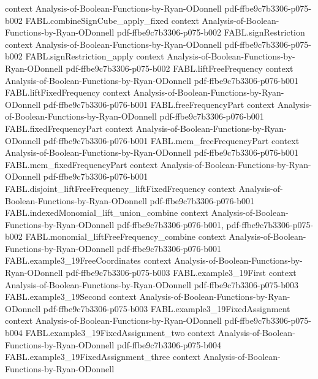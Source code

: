 \begin{theorem}
  {context}
  {Analysis-of-Boolean-Functions-by-Ryan-ODonnell}
  {pdf-ffbe9c7b3306-p075-b002}
\proofstep
  {FABL.combineSignCube_apply_fixed}
  {context}
  {Analysis-of-Boolean-Functions-by-Ryan-ODonnell}
  {pdf-ffbe9c7b3306-p075-b002}
\proofstep
  {FABL.signRestriction}
  {context}
  {Analysis-of-Boolean-Functions-by-Ryan-ODonnell}
  {pdf-ffbe9c7b3306-p075-b002}
\proofstep
  {FABL.signRestriction_apply}
  {context}
  {Analysis-of-Boolean-Functions-by-Ryan-ODonnell}
  {pdf-ffbe9c7b3306-p075-b002}
\proofstep
  {FABL.liftFreeFrequency}
  {context}
  {Analysis-of-Boolean-Functions-by-Ryan-ODonnell}
  {pdf-ffbe9c7b3306-p076-b001}
\proofstep
  {FABL.liftFixedFrequency}
  {context}
  {Analysis-of-Boolean-Functions-by-Ryan-ODonnell}
  {pdf-ffbe9c7b3306-p076-b001}
\proofstep
  {FABL.freeFrequencyPart}
  {context}
  {Analysis-of-Boolean-Functions-by-Ryan-ODonnell}
  {pdf-ffbe9c7b3306-p076-b001}
\proofstep
  {FABL.fixedFrequencyPart}
  {context}
  {Analysis-of-Boolean-Functions-by-Ryan-ODonnell}
  {pdf-ffbe9c7b3306-p076-b001}
\proofstep
  {FABL.mem_freeFrequencyPart}
  {context}
  {Analysis-of-Boolean-Functions-by-Ryan-ODonnell}
  {pdf-ffbe9c7b3306-p076-b001}
\proofstep
  {FABL.mem_fixedFrequencyPart}
  {context}
  {Analysis-of-Boolean-Functions-by-Ryan-ODonnell}
  {pdf-ffbe9c7b3306-p076-b001}
\proofstep
  {FABL.disjoint_liftFreeFrequency_liftFixedFrequency}
  {context}
  {Analysis-of-Boolean-Functions-by-Ryan-ODonnell}
  {pdf-ffbe9c7b3306-p076-b001}
\proofstep
  {FABL.indexedMonomial_lift_union_combine}
  {context}
  {Analysis-of-Boolean-Functions-by-Ryan-ODonnell}
  {pdf-ffbe9c7b3306-p076-b001,
    pdf-ffbe9c7b3306-p075-b002}
\proofstep
  {FABL.monomial_liftFreeFrequency_combine}
  {context}
  {Analysis-of-Boolean-Functions-by-Ryan-ODonnell}
  {pdf-ffbe9c7b3306-p076-b001}
\proofstep
  {FABL.example3_19FreeCoordinates}
  {context}
  {Analysis-of-Boolean-Functions-by-Ryan-ODonnell}
  {pdf-ffbe9c7b3306-p075-b003}
\proofstep
  {FABL.example3_19First}
  {context}
  {Analysis-of-Boolean-Functions-by-Ryan-ODonnell}
  {pdf-ffbe9c7b3306-p075-b003}
\proofstep
  {FABL.example3_19Second}
  {context}
  {Analysis-of-Boolean-Functions-by-Ryan-ODonnell}
  {pdf-ffbe9c7b3306-p075-b003}
\proofstep
  {FABL.example3_19FixedAssignment}
  {context}
  {Analysis-of-Boolean-Functions-by-Ryan-ODonnell}
  {pdf-ffbe9c7b3306-p075-b004}
\proofstep
  {FABL.example3_19FixedAssignment_two}
  {context}
  {Analysis-of-Boolean-Functions-by-Ryan-ODonnell}
  {pdf-ffbe9c7b3306-p075-b004}
\proofstep
  {FABL.example3_19FixedAssignment_three}
  {context}
  {Analysis-of-Boolean-Functions-by-Ryan-ODonnell}

\end{theorem}
